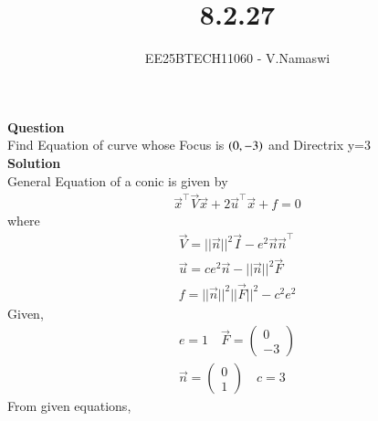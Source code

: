 \documentclass[journal]{IEEEtran}
\begin{document}

\vspace{3cm}

\title{8.2.27}
\author{EE25BTECH11060 - V.Namaswi}
{\let\newpage\relax\maketitle}
\renewcommand{\thefigure}{\theenumi}
\renewcommand{\thetable}{\theenumi}
\setlength{\intextsep}{10pt} %
\textbf{Question}\\Find Equation of curve whose Focus is $\left(0,-3\right)$ and Directrix y=3\\
\textbf{Solution}\\
General Equation of a conic is given by\\
\begin{align}
\Vec{x}^\top \Vec{V} \Vec{x} +2 \Vec{u}^\top \Vec{x}+f=0
\end{align}
where
\begin{align}
\Vec{V}=||\Vec{n}||^2 \Vec{I} -e^2  \Vec{n} \Vec{n} ^\top \\
\Vec{u}=ce^2\Vec{n}-||\Vec{n}||^2 \Vec{F}\\
f=||\Vec{n}||^2 ||\Vec{F}||^2 -c^2 e^2
\end{align}
Given,
\begin{align*}
    e=1  \quad 
    \Vec{F}=\begin{pmatrix}
        0 \\ -3
    \end{pmatrix}\\
    \Vec{n}=\begin{pmatrix}
        0 \\ 1
    \end{pmatrix}  \quad 
    c = 3
\end{align*}
From given equations,
\end{document}
